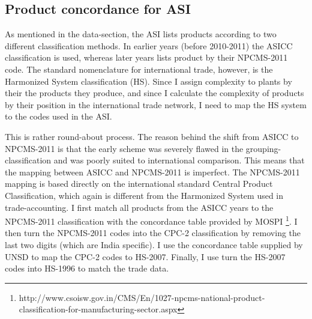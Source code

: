 \documentclass[11pt]{article}
\begin{document}
\begin{appendices}
\subsection{Product concordance for ASI}%
\label{sub:product_concordance_asi}

As mentioned in the data-section, the ASI lists products according to two different classification methods. In earlier years (before 2010-2011) the ASICC classification is used, whereas later years lists product by their NPCMS-2011 code. The standard nomenclature for international trade, however, is the Harmonized System classification (HS). Since I assign complexity to plants by their the products they produce, and since I calculate the complexity of products by their position in the international trade network, I need to map the HS system to the codes used in the ASI.

This is rather round-about process. The reason behind the shift from ASICC to NPCMS-2011 is that the early scheme was severely flawed in the grouping-classification and was poorly suited to international comparison. This means that the mapping between ASICC and NPCMS-2011 is imperfect. The NPCMS-2011 mapping is based directly on the international standard Central Product Classification, which again is different from the Harmonized System used in trade-accounting. I first match all products from the ASICC years to the NPCMS-2011 classification with the concordance table provided by MOSPI \footnote{http://www.csoisw.gov.in/CMS/En/1027-npcms-national-product-classification-for-manufacturing-sector.aspx}. I then turn the NPCMS-2011 codes into the CPC-2 classification by removing the last two digits (which are India specific). I use the concordance table supplied by UNSD to map the CPC-2 codes to HS-2007. Finally, I use turn the HS-2007 codes into HS-1996 to match the trade data. 


\end{appendices}
\end{document}

